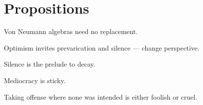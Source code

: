\documentclass[a]{subfiles}
\begin{document}
\chapter{Propositions}
\begin{parsec}%
Von Neumann algebras
need no replacement.
\end{parsec}
\begin{parsec}%
Optimism
invites prevarication and silence
--- change perspective.
\end{parsec}
\begin{parsec}%
Silence is the prelude to decay.
\end{parsec}
\begin{parsec}%
Mediocracy is sticky.
\end{parsec}
\begin{parsec}%
Taking offense where none was intended
is either foolish or cruel.
\end{parsec}
\end{document}
